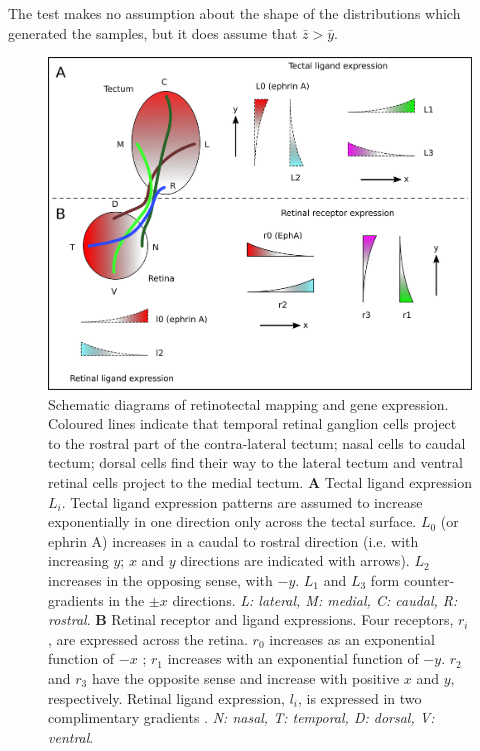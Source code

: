 \documentclass[11pt, a4paper]{article}
\begin{document}
The test makes no assumption about the shape of the distributions which generated the samples, but it does assume that $\bar{z} > \bar{y}$.

%
%

\begin{figure}
\includegraphics[width=\linewidth]{./images/expressions_fig.png}
\caption{Schematic diagrams of retinotectal mapping and gene expression. Coloured lines indicate that temporal retinal ganglion cells project to the rostral part of the contra-lateral tectum; nasal cells to caudal tectum; dorsal cells find their way to the lateral tectum and ventral retinal cells project to the medial tectum.
%
\textbf{A} Tectal ligand expression $L_i$. Tectal ligand expression patterns are assumed to increase exponentially in one direction only across the tectal surface. $L_0$ (or ephrin A) increases in a caudal to rostral direction (i.e. with increasing $y$; $x$ and $y$ directions are indicated with arrows). $L_2$ increases in the opposing sense, with $-y$. $L_1$ and $L_3$ form counter-gradients in the $\pm x$ directions.
\emph{L: lateral, M: medial, C: caudal, R: rostral}.
%
\textbf{B} Retinal receptor and ligand expressions. Four receptors, $r_i$, are expressed across the retina. $r_0$ increases as an exponential function of $-x$ ; $r_1$ increases with an exponential function of $-y$. $r_2$ and $r_3$ have the opposite sense and increase with positive $x$ and $y$, respectively. Retinal ligand expression, $l_i$, is expressed in two complimentary gradients \citep{hornberger_modulation_1999}.
 \emph{N: nasal, T: temporal, D: dorsal, V: ventral}.
%
}
\label{f:ex}
\end{figure}
\end{document}
